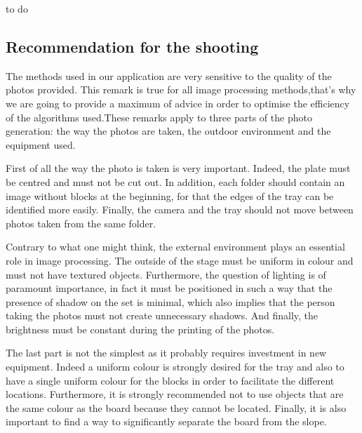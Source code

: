 \documentclass{article}
\begin{document}
to do


\subsection{Recommendation for the shooting}
The methods used in our application are very sensitive to the quality of the photos provided. This remark is true for all image processing methods,that's why we are going to provide a maximum of advice in order to optimise the efficiency of the algorithms used.These remarks apply to three parts of the photo generation: the way the photos are taken, the outdoor environment and the equipment used.
\vspace{0.5 cm}

First of all the way the photo is taken is very important. Indeed, the plate must be centred and must not be cut out.
In addition, each folder should contain an image without blocks at the beginning, for that the edges of the tray can be identified more easily. Finally, the camera and the tray should not move between photos taken from the same folder.
\vspace{0.5 cm}

Contrary to what one might think, the external environment plays an essential role in image processing.
The outside of the stage must be uniform in colour and must not have textured objects. Furthermore, the question of lighting is of paramount importance, in fact it must be positioned in such a way that the presence of shadow on the set is minimal, which also implies that the person taking the photos must not create unnecessary shadows.
 And finally, the brightness must be constant during the printing of the photos.
 \vspace{0.5 cm}
 
 The last part is not the simplest as it probably requires investment in new equipment.
Indeed a uniform colour is strongly desired for the tray and also to have a single uniform colour for the blocks in order to facilitate the different locations. Furthermore, it is strongly recommended not to use objects that are the same colour as the board because they cannot be located.
Finally, it is also important to find a way to significantly separate the board from the slope.
\end{document}
